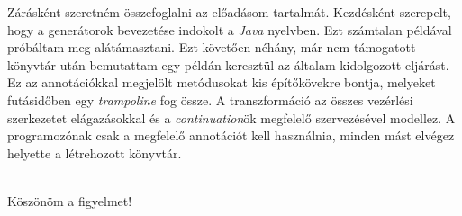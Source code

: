 \documentclass[12pt, a4paper]{article}
\begin{document}
Zárásként szeretném összefoglalni az előadásom tartalmát. Kezdésként szerepelt, hogy a generátorok bevezetése indokolt a \textit{Java} nyelvben. Ezt számtalan példával próbáltam meg alátámasztani. Ezt követően néhány, már nem támogatott könyvtár után bemutattam egy példán keresztül az általam kidolgozott eljárást. Ez az annotációkkal megjelölt metódusokat kis építőkövekre bontja, melyeket futásidőben egy \textit{trampoline} fog össze. A transzformáció az összes vezérlési szerkezetet elágazásokkal és a \textit{continuation}ök megfelelő szervezésével modellez. A programozónak csak a megfelelő annotációt kell használnia, minden mást elvégez helyette a létrehozott könyvtár.

\hfill \\

Köszönöm a figyelmet!
\end{document}
